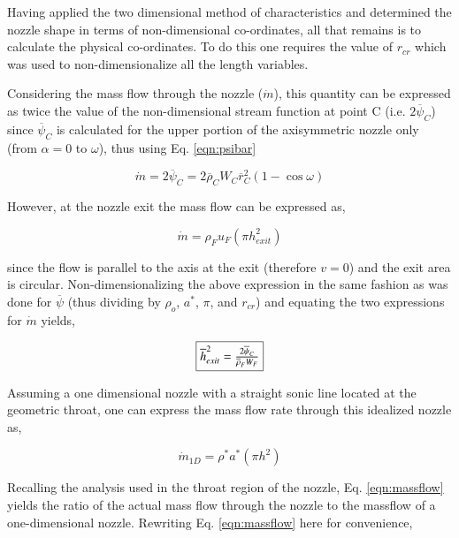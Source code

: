 	Having applied the two dimensional method of characteristics and determined the nozzle shape
in terms of non-dimensional co-ordinates, all that remains is to calculate the physical co-ordinates.
To do this one requires the value of $r_{cr}$ which was used to non-dimensionalize all the length
variables.  

	Considering the mass flow through the nozzle ($\dot{m}$), this quantity can be
expressed as twice the value of the non-dimensional stream function at point C 
(i.e. $2\overline{\psi}_C$) since 
$\overline{\psi}_C$ is calculated for the upper portion of the axisymmetric nozzle only (from $\alpha = 0$ to 
$\omega$), thus using Eq. \ref{eqn:psibar}

\begin{displaymath}
	\dot{m}=2\overline{\psi}_C=2\overline{\rho}_C W_C \overline{r}^2_C (1-\cos\omega)
\end{displaymath}

	However, at the nozzle exit the mass flow can be expressed as,

\begin{equation}
	\dot{m}=\rho_Fu_F(\pi h_{exit}^2)
\label{eqn:massflowexit}
\end{equation}

	since the flow is parallel to the axis at the exit (therefore $v = 0$) and
the exit area is circular.  Non-dimensionalizing the above expression in the same
fashion as was done for $\overline{\psi}$ (thus dividing by $\rho_o$, $a^*$, $\pi$, and 
$r_{cr}$) and equating the two expressions for $\dot{m}$ yields,

\begin{equation}
	\fbox{$
	\overline{h}_{exit}^2=\frac{2\overline{\psi}_C}{\overline{\rho}_F W_F}
	$}
\label{eqn:hexitbar}
\end{equation}

	Assuming a one dimensional nozzle with a straight sonic line located at the geometric throat,
one can express the mass flow rate through this idealized nozzle as,
	
\begin{equation}
	\dot{m}_{1D} = \rho^* a^* (\pi h^2)
\label{eqn:massflow1D}
\end{equation}
	
	Recalling the analysis used in the throat region of the nozzle, Eq. \ref{eqn:massflow}
yields the ratio of the actual mass flow through the nozzle to the massflow of a one-dimensional
nozzle.  Rewriting Eq. \ref{eqn:massflow} here for convenience,

